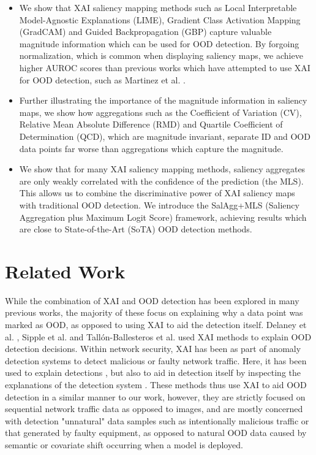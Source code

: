 \documentclass[runningheads]{llncs}
\begin{document}
\begin{itemize}
    \item We show that XAI saliency mapping methods such as Local Interpretable Model-Agnostic Explanations (LIME), Gradient Class Activation Mapping (GradCAM) and Guided Backpropagation (GBP) capture valuable magnitude information which can be used for OOD detection. By forgoing normalization, which is common when displaying saliency maps, we achieve higher AUROC scores than previous works which have attempted to use XAI for OOD detection, such as Martinez et al. \cite{martinez}.
    \item Further illustrating the importance of the magnitude information in saliency maps, we show how aggregations such as the Coefficient of Variation (CV), Relative Mean Absolute Difference (RMD) and Quartile Coefficient of Determination (QCD), which are magnitude invariant, separate ID and OOD data points far worse than aggregations which capture the magnitude.
    \item We show that for many XAI saliency mapping methods, saliency aggregates are only weakly correlated with the confidence of the prediction (the MLS). This allows us to combine the discriminative power of XAI saliency maps with traditional OOD detection. We introduce the SalAgg+MLS (Saliency Aggregation plus Maximum Logit Score) framework, achieving results which are close to State-of-the-Art (SoTA) OOD detection methods.
\end{itemize}

\section{Related Work}

While the combination of XAI and OOD detection has been explored in many previous works, the majority of these focus on explaining why a data point was marked as OOD, as opposed to using XAI to aid the detection itself. Delaney et al. \cite{uncertainty}, Sipple et al. \cite{generalxaiforood} and Tallón-Ballesteros et al. \cite{tallon2020explainable} used XAI methods to explain OOD detection decisions. Within network security, XAI has been as part of anomaly detection systems to detect malicious or faulty network traffic. Here, it has been used to explain detections \cite{idsxai, mahbooba}, but also to aid in detection itself by inspecting the explanations of the detection system \cite{tcydenova2021detection, dnsxai}. These methods thus use XAI to aid OOD detection in a similar manner to our work, however, they are strictly focused on sequential network traffic data as opposed to images, and are mostly concerned with detection "unnatural" data samples such as intentionally malicious traffic or that generated by faulty equipment, as opposed to natural OOD data caused by semantic or covariate shift occurring when a model is deployed.
\end{document}
